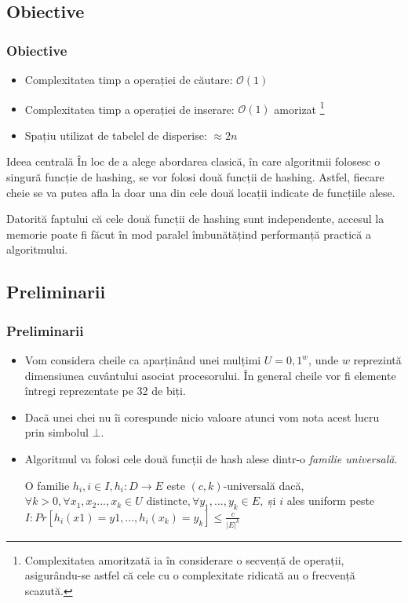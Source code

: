 \documentclass{beamer}
\begin{document}
\subsection{Obiective}

\begin{frame}
\frametitle{Obiective}
\begin{itemize}
\item Complexitatea timp a operației de căutare: $\mathcal{O}(1)$
\item Complexitatea timp a operației de inserare: $\mathcal{O}(1)$ amorizat \footnote{Complexitatea amoritzată ia în considerare o secvență de operații, asigurându-se astfel că cele cu o complexitate ridicată au o frecvență scazută.}
\item Spațiu utilizat de tabelel de disperise: $\approx 2n$
\end{itemize}

\begin{block}{Ideea centrală}
În loc de a alege abordarea clasică, în care algoritmii folosesc o singură funcție de hashing, se vor folosi două funcții de hashing. Astfel, fiecare cheie se va putea afla la doar una din cele două locații indicate de funcțiile alese. 
\end{block}

Datorită faptului că cele două funcții de hashing sunt independente, accesul la memorie poate fi făcut în mod paralel îmbunătățind performanță practică a algoritmului.

\end{frame}
\subsection{Preliminarii}

\begin{frame}
\frametitle{Preliminarii}
\begin{itemize}
\item Vom considera cheile ca aparținând unei mulțimi $U = {0,1}^w$, unde $w$ reprezintă dimensiunea cuvântului asociat procesorului. În general cheile vor fi elemente întregi reprezentate pe 32 de biți.
\item Dacă unei chei nu îi corespunde nicio valoare atunci vom nota acest lucru prin simbolul $\bot$.
\item Algoritmul va folosi cele două funcții de hash alese dintr-o \textit{familie universală}.
\begin{definition}
O familie  $h_i, i \in I, h_i:D \to E$  este $(c,k)$-universală dacă, $\forall k > 0, \forall x_1, x_2 ..., x_k \in U \text{ distincte}, \forall y_1, ..., y_k \in E,$ și $i$ ales uniform peste $I: Pr[h_i(x1) = y1, ..., h_i(x_k) = y_k] \leq \frac{c}{|E|^k}$
\end{definition}
\end{itemize}

\end{frame}
\end{document}
